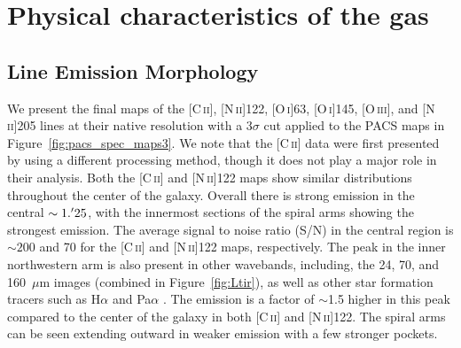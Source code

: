 
\section{Physical characteristics of the gas}\label{gas_char}
\subsection{Line Emission Morphology}\label{morphology}
We present the final maps of the [C\,\textsc{ii}], [N\,\textsc{ii}]122, [O\,\textsc{i}]63, [O\,\textsc{i}]145, [O\,\textsc{iii}], and [N\,\textsc{ii}]205 lines at their native resolution with a 3$\sigma$ cut applied to the PACS maps in Figure~\ref{fig:pacs_spec_maps3}.  We note that the [C\,\textsc{ii}] data were first presented by \citet{2013arXiv1304.1801S} using a different processing method, though it does not play a major role in their analysis. Both the [C\,\textsc{ii}] and [N\,\textsc{ii}]122 maps show similar distributions throughout the center of the galaxy.  Overall there is strong emission in the central $\sim1.\mbox{$^\prime$}25$, with the innermost sections of the spiral arms showing the strongest emission.  The average signal to noise ratio (S/N) in the central region is $\sim200$ and 70 for the [C\,\textsc{ii}] and [N\,\textsc{ii}]122 maps, respectively.  The peak in the inner northwestern arm is also present in other wavebands, including, the 24, 70, and 160~$\mu$m images (combined in Figure~\ref{fig:Ltir}), as well as other star formation tracers such as H$\alpha$ and Pa$\alpha$ \citep[e.g.,][]{2003PASP..115..928K,2005ApJ...633..871C}.   The emission is a factor of $\sim$1.5 higher in this peak compared to the center of the galaxy in both [C\,\textsc{ii}] and [N\,\textsc{ii}]122.  The spiral arms can be seen extending outward in weaker emission with a few stronger pockets.

